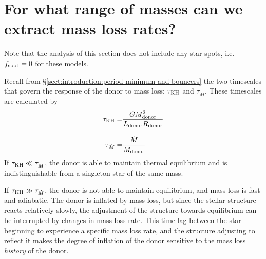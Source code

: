 \newpage
\section{For what range of masses can we extract mass loss rates?}
\label{sect:results:MESA massloss allowable mass range}

Note that the analysis of this section does not include any star spots, i.e. $f_{\rm spot} = 0$ for these models.

Recall from \S\ref{sect:introduction:period minimum and bouncers} the two timescales that govern the response of the donor to mass loss: $\tau_{\rm KH}$ and $\tau_{\dot M}$. These timescales are calculated by
\begin{align}
    \tau_{\rm KH} =& \frac{G M_{\rm donor}^2}{L_{\rm donor} R_{\rm donor}} \\[8pt]
    \tau_{\dot M} =& \frac{\dot M}{M_{\rm donor}}
\end{align}
If $\tau_{\rm KH} \ll \tau_{\dot M}$, the donor is able to maintain thermal equilibrium and is indistinguishable from a singleton star of the same mass.

If $\tau_{\rm KH} \gg \tau_{\dot M}$, the donor is not able to maintain equilibrium, and mass loss is fast and adiabatic.
The donor is inflated by mass loss, but since the stellar structure reacts relatively slowly, the adjustment of the structure towards equilibrium can be interrupted by changes in mass loss rate. This time lag between the star beginning to experience a specific mass loss rate, and the structure adjusting to reflect it makes the degree of inflation of the donor sensitive to the mass loss \textit{history} of the donor.

